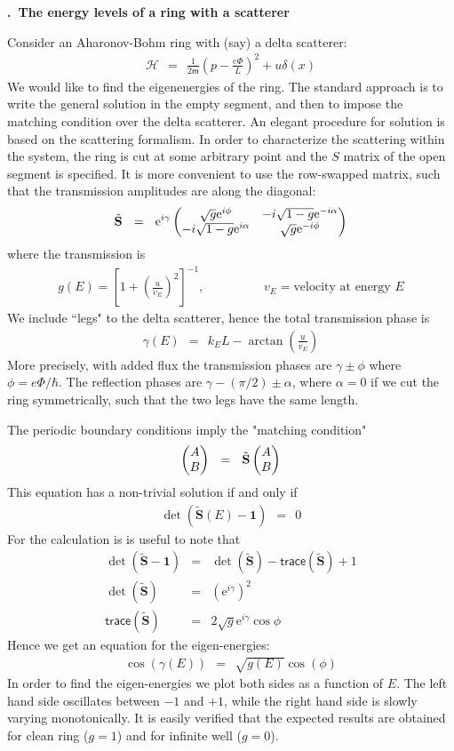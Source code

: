 \documentclass[onecolumn,fleqn, 11pt]{revtex4}
\newcommand{\trc}{\mathsf{trace}}
\newcommand{\eexp}{\mathrm{e}^}
\newcommand{\mass}{\mathsf{m}}
\newcommand{\amatrix}[1]{\begin{matrix} #1 \end{matrix}}
\newcommand{\beq}{\begin{eqnarray}}
\newcommand{\eeq}{\end{eqnarray}}
\renewcommand{\thesubsection}{\arabic{subsection}}
\renewcommand{\thesubsubsection}{\arabic{subsubsection}}
\newcommand{\sheadC}[1]
{
\addtocounter{subsubsection}{1}
\vspace{5mm}
{\bf \thesubsection.\thesubsubsection \ #1}  
\nopagebreak
\phantomsection
}
\begin{document}
\sheadC{The energy levels of a ring with a scatterer}

Consider an Aharonov-Bohm ring with (say) a delta scatterer:
\beq
\mathcal{H} \ \ = \ \ 
\frac{1}{ 2\mass} 
\left( p - \frac{e\Phi}{L} \right)^2 
+ u \delta(x)
\eeq
We would like to find the eigenenergies of the ring.
The standard approach is to write the general solution 
in the empty segment, and then to impose the matching 
condition over the delta scatterer. An elegant procedure 
for solution is based on the scattering formalism. 
In order to characterize the scattering within the system, 
the ring is cut at some arbitrary point and the $S$ matrix of the 
open segment is specified. It is more convenient to  
use the row-swapped matrix, such that the transmission 
amplitudes are along the diagonal:
\beq
\tilde{\mathbf{S}} 
\ \ = \ \ 
\eexp{i\gamma}
\left( \amatrix{\sqrt{g}\eexp{i\phi} &  -i\sqrt{1-g}\eexp{-i\alpha} \cr
-i\sqrt{1-g}\eexp{i\alpha} & \sqrt{g}\eexp{-i\phi}} \right)
\eeq
where the transmission is 
\beq
g(E)=
\left[ 1 
+ \left( \frac{u}{v_E}\right)^2 
\right]^{-1},
\hspace{2cm} v_E = \mbox{velocity at energy $E$} 
\eeq
We include ``legs" to the delta scatterer, 
hence the total transmission phase is  
\beq
\gamma(E) \ \ = \ \ k_E L -\arctan\left( \frac{u}{v_E} \right) 
\eeq
More precisely, with added flux the transmission 
phases are $\gamma\pm\phi$ where $\phi=e\Phi/\hbar$. 
The reflection phases are ${\gamma-(\pi/2) \pm \alpha}$, 
where ${\alpha=0}$ if we cut the ring symmetrically, 
such that the two legs have the same length.  

The periodic boundary conditions imply the "matching condition" 
\beq
\left( \amatrix{ A \cr B } \right) \ \ = \ \  
\tilde{\mathbf{S}}
\left( \amatrix{ A \cr B } \right)
\eeq
This equation has a non-trivial solution if and only if   
\beq
\det(\tilde{\mathbf{S}}(E) -\bm{1}) \ \ = \ \ 0
\eeq
For the calculation is is useful to note that 
\beq
\det(\tilde{\mathbf{S}}-\bm{1}) &=& \det(\tilde{\mathbf{S}})-\trc{(\tilde{\mathbf{S}})}+1 \\
\det(\tilde{\mathbf{S}}) &=& (\eexp{i\gamma})^2  \\
\trc{(\tilde{\mathbf{S}})} &=& 2\sqrt{g}\eexp{i\gamma}\cos{\phi}
\eeq
Hence we get an equation for the eigen-energies:
\beq
\cos(\gamma(E)) \ \ = \ \ \sqrt{g(E)} \cos(\phi)
\eeq
In order to find the eigen-energies we plot both sides as 
a function of $E$. The left hand side oscillates
between $-1$ and $+1$,  while the right hand side 
is slowly varying monotonically. It is easily verified 
that the expected results are obtained for clean ring ($g=1$) 
and for infinite well ($g=0$). 
\end{document}
